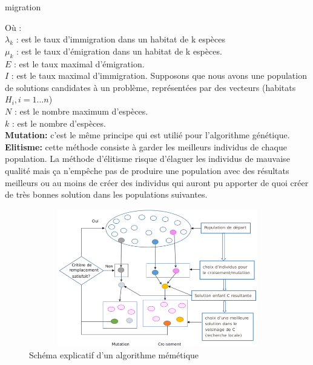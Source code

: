 \begin{enumerate}[label=\alph*)]
\begin{algorithm}[H]
\caption{migration}
\SetAlgoLined
\DontPrintSemicolon


\end{algorithm}



Où : \\
$\lambda_k$ : est le taux d'immigration dans un habitat de k espèces \\
$\mu_k $ : est le taux d'émigration dans un habitat de k espèces. \\
$E$ : est le taux maximal d'émigration.\\
$I$ : est le taux maximal d'immigration. Supposons que nous avons une population de solutions candidates à un problème, représentées par des vecteurs (habitats $H_i , i = 1...n $)\\
$N$ : est le nombre maximum d'espèces.\\
$k$ : est le nombre d'espèces.\\
\textbf{Mutation:} c’est le même principe qui est utilié pour l’algorithme génétique.\\
\textbf{Elitisme:} cette méthode consiste à garder les meilleurs individus de chaque population. La méthode d’élitisme risque d’élaguer les individus de mauvaise qualité mais ça n’empêche pas de produire une population avec des résultats meilleurs ou au moins de créer des individus qui auront pu apporter de quoi créer de très bonnes solution dans les populations suivantes. \\

\begin{figure}[H]
	\centering
	\includegraphics[width=15cm,height=6cm]{Chap3/7.png}
	\caption{Schéma explicatif d’un algorithme mémétique}
	\label{fig:CSF}
\end{figure}	
	

\end{enumerate}
